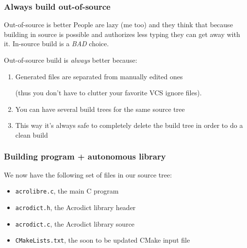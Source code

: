 \documentclass[compress,slidestop,table,usepdftitle=false
              ]
               {beamer}
\newcommand{\fname}[1]{\texttt{#1}}
\begin{document}
\begin{frame}[fragile]
\frametitle{Always build out-of-source}
\begin{alertblock}{Out-of-source is better}
People are lazy (me too) and they think that because
building in source is possible and authorizes less typing
they can get away with it.
In-source build is a \emph{BAD} choice.
\end{alertblock}
Out-of-source build is \emph{always} better because:
\begin{enumerate}
\pause
\item Generated files are separated from manually edited ones

      (thus you don't have to clutter your favorite VCS ignore files).
\pause
\item You can have several build trees for the same source tree
\pause
\item This way it's always safe to completely delete the build tree
      in order to do a clean build
\end{enumerate}
\end{frame}

\begin{frame}[fragile]
\frametitle{Building program + autonomous library}
We now have the following set of files in our source tree:
\begin{itemize}
\item \fname{acrolibre.c}, the main C program
\item \fname{acrodict.h}, the Acrodict library header
\item \fname{acrodict.c}, the Acrodict library source
\item \fname{CMakeLists.txt}, the soon to be updated CMake input file
\end{itemize}
\end{frame}
\end{document}
